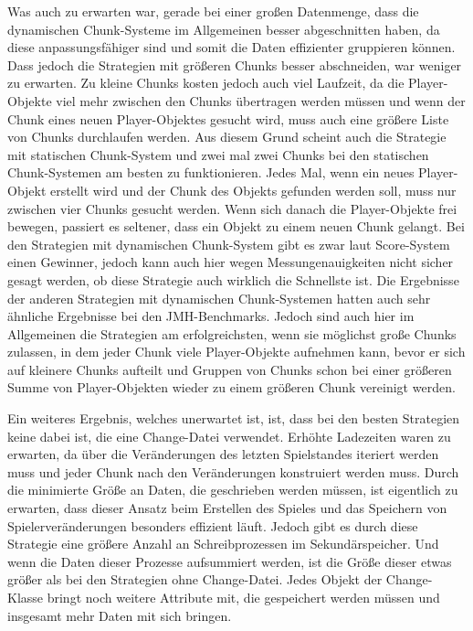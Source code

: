 Was auch zu erwarten war, gerade bei einer großen Datenmenge, dass die dynamischen Chunk-Systeme im Allgemeinen besser abgeschnitten haben, da diese anpassungsfähiger sind und somit die Daten effizienter gruppieren können. Dass jedoch die Strategien mit größeren Chunks besser abschneiden, war weniger zu erwarten. Zu kleine Chunks kosten jedoch auch viel Laufzeit, da die Player-Objekte viel mehr zwischen den Chunks übertragen werden müssen und wenn der Chunk eines neuen Player-Objektes gesucht wird, muss auch eine größere Liste von Chunks durchlaufen werden. Aus diesem Grund scheint auch die Strategie mit statischen Chunk-System und zwei mal zwei Chunks bei den statischen Chunk-Systemen am besten zu funktionieren. Jedes Mal, wenn ein neues Player-Objekt erstellt wird und der Chunk des Objekts gefunden werden soll, muss nur zwischen vier Chunks gesucht werden. Wenn sich danach die Player-Objekte frei bewegen, passiert es seltener, dass ein Objekt zu einem neuen Chunk gelangt. Bei den Strategien mit dynamischen Chunk-System gibt es zwar laut Score-System einen Gewinner, jedoch kann auch hier wegen Messungenauigkeiten nicht sicher gesagt werden, ob diese Strategie auch wirklich die Schnellste ist. Die Ergebnisse der anderen Strategien mit dynamischen Chunk-Systemen hatten auch sehr ähnliche Ergebnisse bei den JMH-Benchmarks. Jedoch sind auch hier im Allgemeinen die Strategien am erfolgreichsten, wenn sie möglichst große Chunks zulassen, in dem jeder Chunk viele Player-Objekte aufnehmen kann, bevor er sich auf kleinere Chunks aufteilt und Gruppen von Chunks schon bei einer größeren Summe von Player-Objekten wieder zu einem größeren Chunk vereinigt werden.

Ein weiteres Ergebnis, welches unerwartet ist, ist, dass bei den besten Strategien keine dabei ist, die eine Change-Datei verwendet. Erhöhte Ladezeiten waren zu erwarten, da über die Veränderungen des letzten Spielstandes iteriert werden muss und jeder Chunk nach den Veränderungen konstruiert werden muss. Durch die minimierte Größe an Daten, die geschrieben werden müssen, ist eigentlich zu erwarten, dass dieser Ansatz beim Erstellen des Spieles und das Speichern von Spielerveränderungen besonders effizient läuft. Jedoch gibt es durch diese Strategie eine größere Anzahl an Schreibprozessen im Sekundärspeicher. Und wenn die Daten dieser Prozesse aufsummiert werden, ist die Größe dieser etwas größer als bei den Strategien ohne Change-Datei. Jedes Objekt der Change-Klasse bringt noch weitere Attribute mit, die gespeichert werden müssen und insgesamt mehr Daten mit sich bringen.

